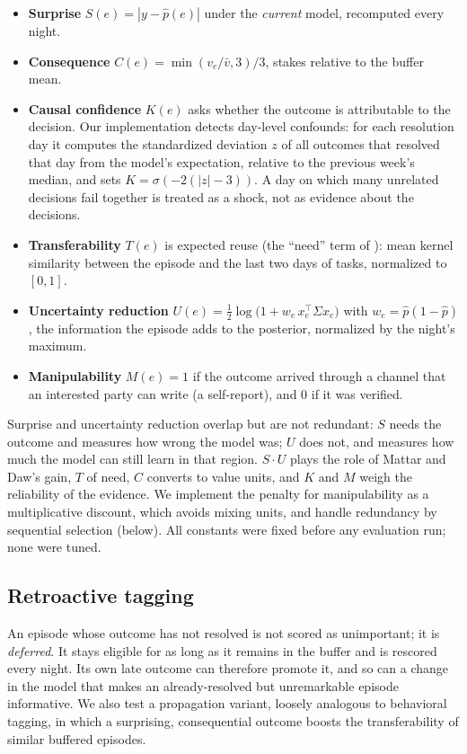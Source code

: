 \documentclass[11pt]{article}
\begin{document}
\begin{itemize}
\item \textbf{Surprise} $S(e)=|y-\hat p(e)|$ under the \emph{current} model, recomputed every night.
\item \textbf{Consequence} $C(e)=\min(v_e/\bar v,3)/3$, stakes relative to the buffer mean.
\item \textbf{Causal confidence} $K(e)$ asks whether the outcome is attributable to the decision. Our implementation detects day-level confounds: for each resolution day it computes the standardized deviation $z$ of all outcomes that resolved that day from the model's expectation, relative to the previous week's median, and sets $K=\sigma(-2(|z|-3))$. A day on which many unrelated decisions fail together is treated as a shock, not as evidence about the decisions.
\item \textbf{Transferability} $T(e)$ is expected reuse (the ``need'' term of \citep{mattar2018}): mean kernel similarity between the episode and the last two days of tasks, normalized to $[0,1]$.
\item \textbf{Uncertainty reduction} $U(e)=\tfrac12\log\!\big(1+w_e\,x_e^\top\Sigma x_e\big)$ with $w_e=\hat p(1-\hat p)$, the information the episode adds to the posterior, normalized by the night's maximum.
\item \textbf{Manipulability} $M(e)=1$ if the outcome arrived through a channel that an interested party can write (a self-report), and $0$ if it was verified.
\end{itemize}

Surprise and uncertainty reduction overlap but are not redundant: $S$ needs the outcome and measures how wrong the model was; $U$ does not, and measures how much the model can still learn in that region. $S\cdot U$ plays the role of Mattar and Daw's gain, $T$ of need, $C$ converts to value units, and $K$ and $M$ weigh the reliability of the evidence. We implement the penalty for manipulability as a multiplicative discount, which avoids mixing units, and handle redundancy by sequential selection (below). All constants were fixed before any evaluation run; none were tuned.

\subsection{Retroactive tagging}
An episode whose outcome has not resolved is not scored as unimportant; it is \emph{deferred}. It stays eligible for as long as it remains in the buffer and is rescored every night. Its own late outcome can therefore promote it, and so can a change in the model that makes an already-resolved but unremarkable episode informative. We also test a propagation variant, loosely analogous to behavioral tagging, in which a surprising, consequential outcome boosts the transferability of similar buffered episodes.
\end{document}
